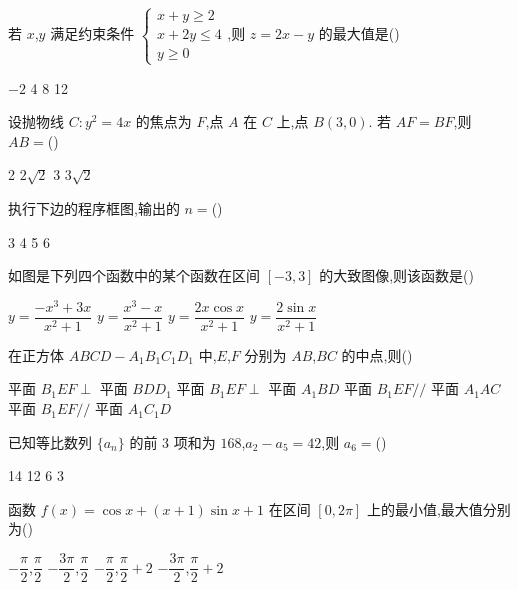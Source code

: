 \begin{problem}
若 \(x\),\(y\) 满足约束条件 \(\begin{cases}
x+y\ge2\\
x+2y\le4\\
y\ge0
\end{cases}\),则 \(z=2x-y\) 的最大值是(\quad)

\choices
    {\(-2\)}
    {4}
    {8}
    {12}
\end{problem}

\begin{problem}
设抛物线 \(C:y^2=4x\) 的焦点为 \(F\),点 \(A\) 在 \(C\) 上,点 \(B(3,0)\). 若 \(AF=BF\),则 \(AB=\)(\quad)

\choices
    {2}
    {\(2\sqrt2\)}
    {3}
    {\(3\sqrt2\)}
\end{problem}

\begin{problem}
执行下边的程序框图,输出的 \(n=\)(\quad)


\choices
    {3}
    {4}
    {5}
    {6}
\end{problem}

\begin{problem}
如图是下列四个函数中的某个函数在区间 \([-3,3]\) 的大致图像,则该函数是(\quad)

\choices
    {\(y=\dfrac{-x^3+3x}{x^2+1}\)}
    {\(y=\dfrac{x^3-x}{x^2+1}\)}
    {\(y=\dfrac{2x\cos x}{x^2+1}\)}
    {\(y=\dfrac{2\sin x}{x^2+1}\)}
\end{problem}

\begin{problem}
在正方体 \(ABCD-A_1B_1C_1D_1\) 中,\(E\),\(F\) 分别为 \(AB\),\(BC\) 的中点,则(\quad)

\choices
    {平面 \(B_1EF\perp\) 平面 \(BDD_1\)}
    {平面 \(B_1EF\perp\) 平面 \(A_1BD\)}
    {平面 \(B_1EF//\) 平面 \(A_1AC\)}
    {平面 \(B_1EF//\) 平面 \(A_1C_1D\)}
\end{problem}

\begin{problem}
已知等比数列 \(\{a_n\}\) 的前 \(3\) 项和为 \(168\),\(a_2-a_5=42\),则 \(a_6=\)(\quad)

\choices
    {14}
    {12}
    {6}
    {3}
\end{problem}

\begin{problem}
函数 \(f(x)=\cos x+(x+1)\sin x+1\) 在区间 \([0,2\pi]\) 上的最小值,最大值分别为(\quad)

\choices
    {\(-\dfrac{\pi}{2}\),\(\dfrac{\pi}{2}\)}
    {\(-\dfrac{3\pi}{2}\),\(\dfrac{\pi}{2}\)}
    {\(-\dfrac{\pi}{2}\),\(\dfrac{\pi}{2}+2\)}
    {\(-\dfrac{3\pi}{2}\),\(\dfrac{\pi}{2}+2\)}
\end{problem}

